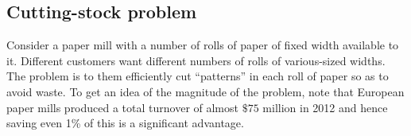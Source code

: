 \documentclass[letterpaper, 10pt, twocolumn, reqno]{amsart}
\begin{document}


\subsection{Cutting-stock problem}
\label{ssec:col_gen_cutting_stock}

Consider a paper mill with a number of rolls of paper of fixed width available to it. Different customers want different numbers of rolls of various-sized widths. The problem is to them efficiently cut ``patterns'' in each roll of paper so as to avoid waste. To get an idea of the magnitude of the problem, note that European paper mills produced a total turnover of almost $\$ 75$ million in 2012 and hence saving even 1\% of this is a significant advantage.
\end{document}
